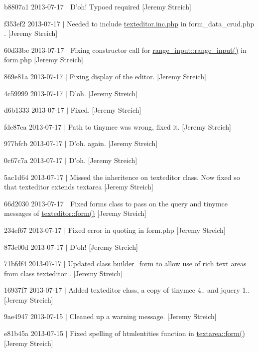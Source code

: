 \begin{DoxyItemize}
\item b8807a1 2013-\/07-\/17 $|$ D'oh! Typoed required \mbox{[}Jeremy Streich\mbox{]}
\item f353ef2 2013-\/07-\/17 $|$ Needed to include \hyperlink{texteditor_8inc_8php}{texteditor.\-inc.\-php} in form\-\_\-data\-\_\-crud.\-php . \mbox{[}Jeremy Streich\mbox{]}
\item 60d33be 2013-\/07-\/17 $|$ Fixing constructor call for \hyperlink{classrange__input_a6038a3b2b1499abb08ff6a10ac7a8e81}{range\-\_\-input\-::range\-\_\-input()} in form.\-php \mbox{[}Jeremy Streich\mbox{]}
\item 869e81a 2013-\/07-\/17 $|$ Fixing display of the editor. \mbox{[}Jeremy Streich\mbox{]}
\item 4c59999 2013-\/07-\/17 $|$ D'oh. \mbox{[}Jeremy Streich\mbox{]}
\item d6b1333 2013-\/07-\/17 $|$ Fixed. \mbox{[}Jeremy Streich\mbox{]}
\item fde87ca 2013-\/07-\/17 $|$ Path to tinymce was wrong, fixed it. \mbox{[}Jeremy Streich\mbox{]}
\item 977bfcb 2013-\/07-\/17 $|$ D'oh. again. \mbox{[}Jeremy Streich\mbox{]}
\item 0c67c7a 2013-\/07-\/17 $|$ D'oh. \mbox{[}Jeremy Streich\mbox{]}
\item 5ac1d64 2013-\/07-\/17 $|$ Missed the inheritence on texteditor class. Now fixed so that texteditor extends textarea \mbox{[}Jeremy Streich\mbox{]}
\item 66d2030 2013-\/07-\/17 $|$ Fixed forms class to pass on the query and tinymce messages of \hyperlink{classtexteditor_a129b929db008ec11f4a683f542787c74}{texteditor\-::form()} \mbox{[}Jeremy Streich\mbox{]}
\item 234ef67 2013-\/07-\/17 $|$ Fixed error in quoting in form.\-php \mbox{[}Jeremy Streich\mbox{]}
\item 873e00d 2013-\/07-\/17 $|$ D'oh! \mbox{[}Jeremy Streich\mbox{]}
\item 71bfdf4 2013-\/07-\/17 $|$ Updated class \hyperlink{classbuilder__form}{builder\-\_\-form} to allow use of rich text areas from class texteditor . \mbox{[}Jeremy Streich\mbox{]}
\item 16937f7 2013-\/07-\/17 $|$ Added texteditor class, a copy of tinymce 4.. and jquery 1.. \mbox{[}Jeremy Streich\mbox{]}
\item 9ae4947 2013-\/07-\/15 $|$ Cleaned up a warning message. \mbox{[}Jeremy Streich\mbox{]}
\item e81b45a 2013-\/07-\/15 $|$ Fixed spelling of htmlentities function in \hyperlink{classtextarea_a3e3d02a7c0ff76c86f6b987e1193ca6a}{textarea\-::form()} \mbox{[}Jeremy Streich\mbox{]}

\end{DoxyItemize}

